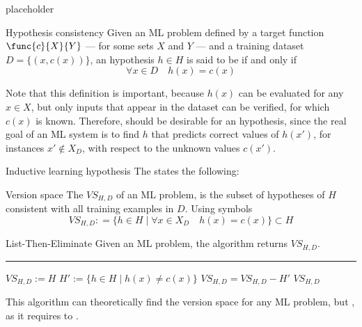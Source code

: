 \documentclass[a4paper, 12pt]{report}
\begin{document}
    placeholder 

    \begin{frameddefn}{Hypothesis consistency}
        Given an ML problem defined by a target function $\func{c}{X}{Y}$ --- for some sets $X$ and $Y$ --- and a training dataset $D = \{(x, c(x))\}$, an hypothesis $h \in H$ is said to be  if and only if $$\forall x \in D \quad h(x) = c(x)$$
    \end{frameddefn}

    Note that this definition is important, because $h(x)$ can be evaluated for any $x \in X$, but only inputs that appear in the dataset can be verified, for which $c(x)$ is known. Therefore,  should be desirable for an hypothesis, since the real goal of an ML system is to find  $h$ that predicts correct values of $h(x')$, for instances $x' \notin X_D$, with respect to the unknown values $c(x')$.

    \begin{frameddefn}{Inductive learning hypothesis}
        The  states the following: 
    \end{frameddefn}

    \begin{frameddefn}{Version space}
        The  $VS_{H, D}$ of an ML problem, is the subset of hypotheses of $H$ consistent with all training examples in $D$. Using symbols $$VS_{H, D}: = \{h \in H \mid \forall x \in X_D \quad h(x) = c(x)\} \subset H$$
    \end{frameddefn}

    \begin{framedalgo}{List-Then-Eliminate}
        Given an ML problem, the algorithm returns $VS_{H, D}$. \\

        \hrule

        \quad
        \label{alg:lte}
        \begin{algorithmic}[1]
                \State $VS_{H, D} := H$ 
                    \State $H' := \{h \in H \mid h(x) \neq c(x)\}$ 
                    \State $VS_{H, D} = VS_{H, D} - H'$
                \EndFor
                \State {} $VS_{H,D}$
            \EndFunction
        \end{algorithmic}
    \end{framedalgo}

    This algorithm can theoretically find the version space for any ML problem, but , as it requires to .
\end{document}
